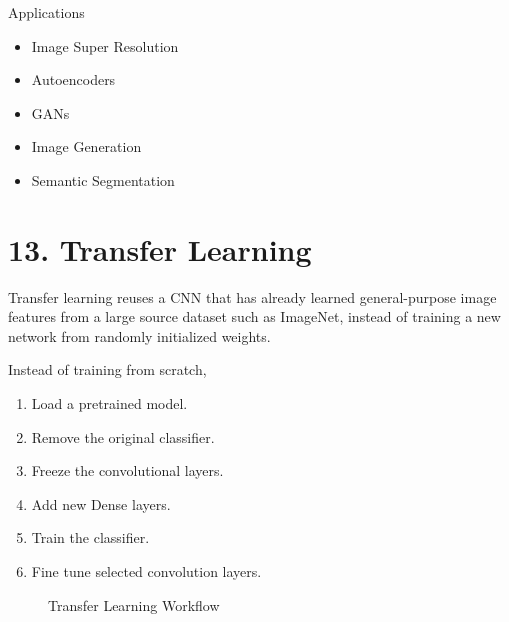 \documentclass[11pt]{article}
\begin{document}
Applications

\begin{itemize}
\item Image Super Resolution
\item Autoencoders
\item GANs
\item Image Generation
\item Semantic Segmentation
\end{itemize}


\section*{13. Transfer Learning}

Transfer learning reuses a CNN that has already learned general-purpose
image features from a large source dataset such as ImageNet, instead of
training a new network from randomly initialized weights.

Instead of training from scratch,

\begin{enumerate}
\item Load a pretrained model.
\item Remove the original classifier.
\item Freeze the convolutional layers.
\item Add new Dense layers.
\item Train the classifier.
\item Fine tune selected convolution layers.
\end{enumerate}

\begin{figure}[H]

\centering


\caption{Transfer Learning Workflow}

\end{figure}
\end{document}
